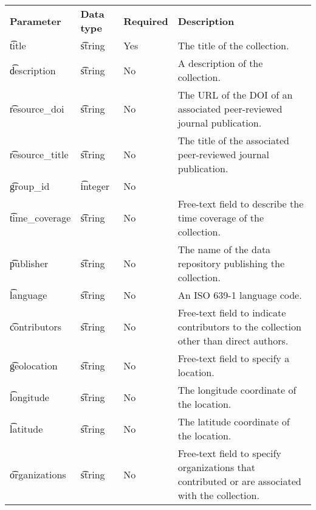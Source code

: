 \begin{tabularx}{\textwidth}{*{3}{!{\VRule[-1pt]}l}!{\VRule[-1pt]}X}
  \headrow
  \textbf{Parameter} & \textbf{Data type} & \textbf{Required} & \textbf{Description}\\
  \t{title}          & \t{string}    & Yes  & The title of the collection.\\
  \t{description}    & \t{string}    & No   & A description of the collection.\\
  \t{resource\_doi}  & \t{string}    & No   & The URL of the DOI of an
                                              associated peer-reviewed
                                              journal publication.\\
  \t{resource\_title} & \t{string}   & No   & The title of the associated
                                              peer-reviewed journal
                                              publication.\\
  \t{group\_id}      & \t{integer}   & No   & \\
  \t{time\_coverage} & \t{string}    & No   & Free-text field to describe the
                                              time coverage of the collection.\\
  \t{publisher}      & \t{string}    & No   & The name of the data repository
                                              publishing the collection.\\
  \t{language}       & \t{string}    & No   & An ISO 639-1 language code.\\
  \t{contributors}   & \t{string}    & No   & Free-text field to indicate
                                              contributors to the collection
                                              other than direct authors.\\
  \t{geolocation}    & \t{string}    & No   & Free-text field to specify a
                                              location.\\
  \t{longitude}      & \t{string}    & No   & The longitude coordinate of the
                                              location.\\
  \t{latitude}       & \t{string}    & No   & The latitude coordinate of the
                                              location.\\
  \t{organizations}  & \t{string}    & No   & Free-text field to specify
                                              organizations that contributed
                                              or are associated with the
                                              collection.\\

\end{tabularx}
